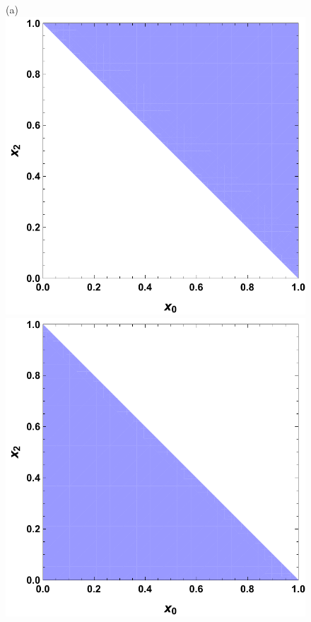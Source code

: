 \documentclass[12pt]{iopart}
\begin{document}
\begin{figure}
\begin{center}
(a) \includegraphics[height=0.29\textwidth]{BorisCatRegion1}
    \hspace{0.05\textwidth} \includegraphics[height=0.29\textwidth]{BorisCatRegion2}

\medskip


\end{center}
\end{figure}
\end{document}
